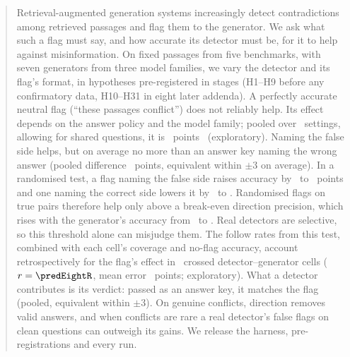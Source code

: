\begin{abstract}
Retrieval-augmented generation systems increasingly detect contradictions among retrieved passages and flag them to
the generator. We ask what such a flag must say, and how accurate its detector must be, for it to help against
misinformation. On fixed passages from five benchmarks, with seven generators from three model families, we vary the
detector and its flag's format, in hypotheses pre-registered in stages (H1--H9 before any confirmatory data,
H10--H31 in eight later addenda). A perfectly accurate neutral flag (``these passages conflict'') does not reliably
help. Its effect depends on the answer policy and the model family; pooled over \neuMlK\ settings, allowing
for shared questions, it is \neuMlMu\ points \neuMlCI\ (exploratory). Naming the false side helps, but on average no more than
an answer key naming the wrong answer (pooled difference \PoolTwentyThree\ points, equivalent within $\pm$3 on average). In a
randomised test, a flag naming the false side raises accuracy by \hThirtyOneAMin\ to \hThirtyOneAMax\ points and one naming the correct side lowers it by
\ahThirtyOneBMax\ to \ahThirtyOneBMin. Randomised flags on true pairs therefore help only above a break-even direction
precision, which rises with the generator's accuracy from \beMin\ to \beMax. Real detectors are selective, so this
threshold alone can misjudge them. The follow rates from this test, combined with each cell's coverage and no-flag
accuracy, account retrospectively for the flag's effect in \predEightN\ crossed detector--generator cells
($r=\predEightR$, mean error \predEightMae\ points; exploratory). What a
detector contributes is its verdict: passed as an answer key, it matches the flag (pooled, equivalent within $\pm$3). On genuine
conflicts, direction removes valid answers, and when conflicts are rare a real detector's false flags on clean
questions can outweigh its gains. We release the harness, pre-registrations and every run.
\end{abstract}
